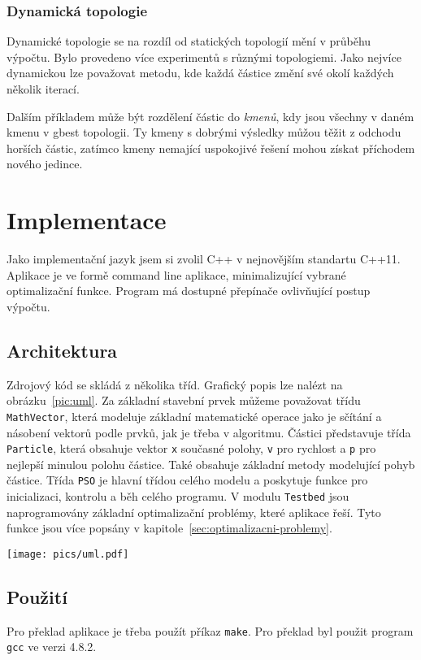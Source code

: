\documentclass[12pt,a4paper,fleqn]{article}
\begin{document}
\subsubsection{Dynamická topologie}
Dynamické topologie se na rozdíl od statických topologií mění v průběhu výpočtu.  Bylo provedeno více experimentů s různými topologiemi. Jako nejvíce dynamickou lze považovat metodu, kde každá částice změní své okolí každých několik iterací. 

Dalším příkladem může být rozdělení částic do \textit{kmenů}, kdy jsou všechny v daném kmenu v gbest topologii. Ty kmeny s dobrými výsledky můžou těžit z odchodu horších částic, zatímco kmeny nemající uspokojivé řešení mohou získat příchodem nového jedince.
\section{Implementace} \label{implementace}
Jako implementační jazyk jsem si zvolil C++ v nejnovějším standartu C++11. Aplikace je ve formě command line aplikace, minimalizující vybrané optimalizační funkce. Program má dostupné přepínače ovlivňující postup výpočtu.

\subsection{Architektura}
Zdrojový kód se skládá z několika tříd. Grafický popis lze nalézt na obrázku~\ref{pic:uml}. Za základní stavební prvek můžeme považovat třídu \texttt{MathVector}, která modeluje základní matematické operace jako je sčítání a násobení vektorů podle prvků, jak je třeba v algoritmu. Částici představuje třída \texttt{Particle}, která obsahuje vektor \texttt{x} současné polohy, \texttt{v} pro rychlost a \texttt{p} pro nejlepší minulou polohu částice. Také obsahuje základní metody modelující pohyb částice. Třída \texttt{PSO} je hlavní třídou celého modelu a poskytuje funkce pro inicializaci, kontrolu a běh celého programu. V modulu \texttt{Testbed} jsou naprogramovány základní optimalizační problémy, které aplikace řeší. Tyto funkce jsou více popsány v kapitole~\ref{sec:optimalizacni-problemy}.
\begin{figure*}[h]
\label{pic:uml}
\centering
\texttt{[image: pics/uml.pdf]}
\caption{UML diagram důležitých částí výsledného programu}
\end{figure*}


\subsection{Použití}
Pro překlad aplikace je třeba použít příkaz \texttt{make}. Pro překlad byl použit program \texttt{gcc} ve verzi 4.8.2.
\end{document}
